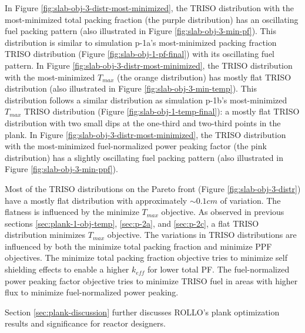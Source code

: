 In Figure \ref{fig:slab-obj-3-distr-most-minimized}, the TRISO distribution with the
most-minimized total packing fraction (the purple distribution) has an oscillating fuel 
packing pattern (also illustrated in Figure \ref{fig:slab-obj-3-min-pf}).
This distribution is similar to simulation p-1a's most-minimized packing fraction TRISO 
distribution (Figure \ref{fig:slab-obj-1-pf-final}) with its oscillating fuel pattern. 
In Figure \ref{fig:slab-obj-3-distr-most-minimized}, the TRISO distribution with the 
most-minimized $T_{max}$ (the orange distribution) has mostly flat TRISO distribution 
(also illustrated in Figure \ref{fig:slab-obj-3-min-temp}). 
This distribution follows a similar distribution as simulation p-1b's most-minimized 
$T_{max}$ TRISO distribution (Figure \ref{fig:slab-obj-1-temp-final}): a mostly flat 
TRISO distribution with two small dips at the one-third and two-third points in the 
plank.
In Figure \ref{fig:slab-obj-3-distr-most-minimized}, the TRISO distribution with the
most-minimized fuel-normalized power peaking factor (the pink distribution) has a 
slightly oscillating fuel packing pattern (also illustrated in Figure 
\ref{fig:slab-obj-3-min-ppf}).

Most of the \gls{TRISO} distributions on the Pareto front (Figure 
\ref{fig:slab-obj-3-distr}) have a mostly flat distribution with approximately 
$\sim0.1cm$ of variation. 
The flatness is influenced by the minimize $T_{max}$ objective. 
As observed in previous sections \ref{sec:plank-1-obj-temp}, \ref{sec:p-2a}, and 
\ref{sec:p-2c}, a flat \gls{TRISO} distribution minimizes $T_{max}$ objective.
The variations in \gls{TRISO} distributions are influenced by both the minimize 
total packing fraction and minimize PPF objectives. 
The minimize total packing fraction objective tries to minimize self shielding effects 
to enable a higher $k_{eff}$ for lower total PF. 
The fuel-normalized power peaking factor objective tries to minimize 
TRISO fuel in areas with higher flux to minimize fuel-normalized power peaking.

Section \ref{sec:plank-discussion} further discusses \gls{ROLLO}'s plank 
optimization results and significance for reactor designers.


